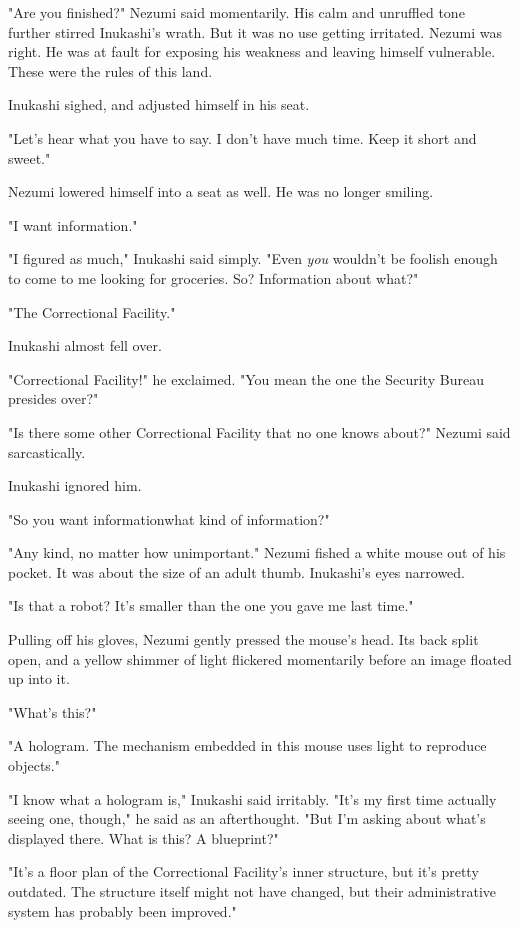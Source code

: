"Are you finished?" Nezumi said momentarily. His calm and unruffled tone
further stirred Inukashi's wrath. But it was no use getting irritated.
Nezumi was right. He was at fault for exposing his weakness and leaving
himself vulnerable. These were the rules of this land.

Inukashi sighed, and adjusted himself in his seat.

"Let's hear what you have to say. I don't have much time. Keep it short
and sweet."

Nezumi lowered himself into a seat as well. He was no longer smiling.

\mybreak

"I want information."

"I figured as much," Inukashi said simply. "Even \emph{you} wouldn't be foolish
enough to come to me looking for groceries. So? Information about what?"

"The Correctional Facility."

Inukashi almost fell over.

"Correctional Facility!" he exclaimed. "You mean the one the Security
Bureau presides over?"

"Is there some other Correctional Facility that no one knows about?"
Nezumi said sarcastically.

Inukashi ignored him.

"So you want information\el what kind of information?"

"Any kind, no matter how unimportant." Nezumi fished a white mouse out
of his pocket. It was about the size of an adult thumb. Inukashi's eyes
narrowed.

"Is that a robot? It's smaller than the one you gave me last time."

Pulling off his gloves, Nezumi gently pressed the mouse's head. Its back
split open, and a yellow shimmer of light flickered momentarily before
an image floated up into it.

"What's this?"

"A hologram. The mechanism embedded in this mouse uses light to
reproduce objects."

"I know what a hologram is," Inukashi said irritably. "It's my first
time actually seeing one, though," he said as an afterthought. "But I'm
asking about what's displayed there. What is this? A blueprint?"

"It's a floor plan of the Correctional Facility's inner structure, but
it's pretty outdated. The structure itself might not have changed, but
their administrative system has probably been improved."


